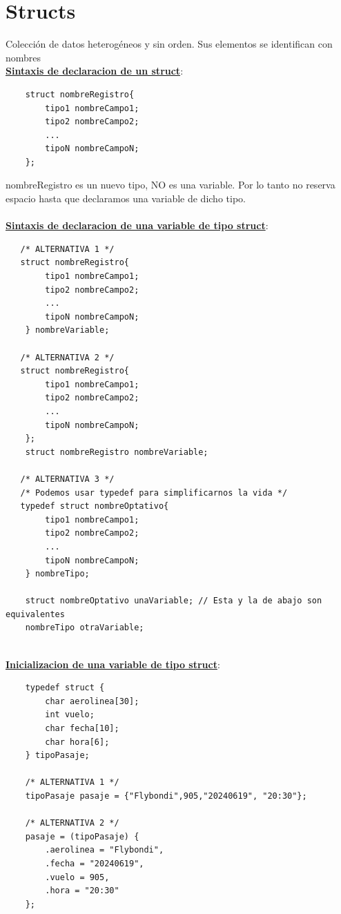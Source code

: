 \documentclass{article}
\newcommand{\bld}[1]{\textbf{#1}}
\begin{document}
\newpage
\section{Structs}
Colección de datos heterogéneos y sin orden. Sus elementos se identifican con nombres
\\\underline{\bld{Sintaxis de declaracion de un struct}}:
\begin{lstlisting}
    struct nombreRegistro{
        tipo1 nombreCampo1;
        tipo2 nombreCampo2;
        ...
        tipoN nombreCampoN;
    };
\end{lstlisting}
nombreRegistro es un nuevo tipo, NO es una variable. Por lo tanto no reserva espacio hasta
que declaramos una variable de dicho tipo.
\\\\\underline{\bld{Sintaxis de declaracion de una variable de tipo struct}}:
\begin{lstlisting}
   /* ALTERNATIVA 1 */ 
   struct nombreRegistro{
        tipo1 nombreCampo1;
        tipo2 nombreCampo2;
        ...
        tipoN nombreCampoN;
    } nombreVariable;

   /* ALTERNATIVA 2 */ 
   struct nombreRegistro{
        tipo1 nombreCampo1;
        tipo2 nombreCampo2;
        ...
        tipoN nombreCampoN;
    };
    struct nombreRegistro nombreVariable;

   /* ALTERNATIVA 3 */ 
   /* Podemos usar typedef para simplificarnos la vida */
   typedef struct nombreOptativo{
        tipo1 nombreCampo1;
        tipo2 nombreCampo2;
        ...
        tipoN nombreCampoN;
    } nombreTipo;

    struct nombreOptativo unaVariable; // Esta y la de abajo son equivalentes 
    nombreTipo otraVariable;
\end{lstlisting}

\leavevmode\\\underline{\bld{Inicializacion de una variable de tipo struct}}:
\begin{lstlisting}
    typedef struct {
        char aerolinea[30];
        int vuelo;
        char fecha[10];
        char hora[6];
    } tipoPasaje;

    /* ALTERNATIVA 1 */
    tipoPasaje pasaje = {"Flybondi",905,"20240619", "20:30"};
    
    /* ALTERNATIVA 2 */
    pasaje = (tipoPasaje) {
        .aerolinea = "Flybondi",
        .fecha = "20240619",
        .vuelo = 905,
        .hora = "20:30"
    };
\end{lstlisting}
\end{document}
